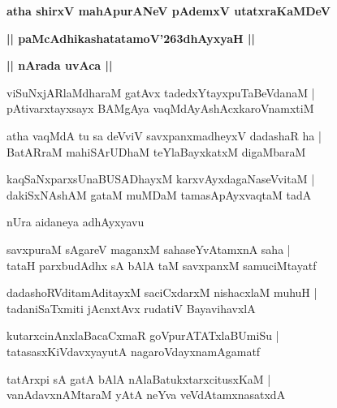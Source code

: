 \documentclass[twoside,12pt,openright]{book}
\def\S{\char'263}
\newcounter{shloka}[chapter]
\def\uvaca#1{\centerline{{\large\textbf{#1}}}}
\begin{document}
\begin{center}
{\LARGE\bfseries atha shirxV mahApurANeV pAdemxV utatxraKaMDeV}
\end{center}

\begin{center}
{\LARGE\bfseries || paMcAdhikashatatamoV\S dhAyxyaH || }
\end{center}

\uvaca{|| nArada uvAca ||}

\begin{shloka}%
viSuNxjARlaMdharaM gatAvx tadedxYtayxpuTaBeVdanaM |\\
pAtivarxtayxsayx BAMgAya vaqMdAyAshAcxkaroVnamxtiM 
\end{shloka}

\begin{shloka}%
atha vaqMdA tu sa deVviV savxpanxmadheyxV dadashaR ha |\\
BatARraM mahiSArUDhaM teYlaBayxkatxM digaMbaraM 
\end{shloka}

\begin{shloka}%
kaqSaNxparxsUnaBUSADhayxM karxvAyxdagaNaseVvitaM |\\
dakiSxNAshAM gataM muMDaM tamasApAyxvaqtaM tadA 
\end{shloka}

\begin{center}
nUra aidaneya adhAyxyavu
\end{center}

\begin{shloka}%
savxpuraM sAgareV maganxM sahaseYvAtamxnA saha |\\
tataH parxbudAdhx sA bAlA taM savxpanxM samuciMtayatf 
\end{shloka}

\begin{shloka}%
dadashoRVditamAditayxM saciCxdarxM nishacxlaM muhuH |\\
tadaniSaTxmiti jAcnxtAvx rudatiV BayavihavxlA 
\end{shloka}

\begin{shloka}%
kutarxcinAnxlaBacaCxmaR goVpurATATxlaBUmiSu |\\
tatasasxKiVdavxyayutA nagaroVdayxnamAgamatf 
\end{shloka}

\begin{shloka}%
tatArxpi sA gatA bAlA nAlaBatukxtarxcitusxKaM |\\
vanAdavxnAMtaraM yAtA neYva veVdAtamxnasatxdA  
\end{shloka}
\end{document}

